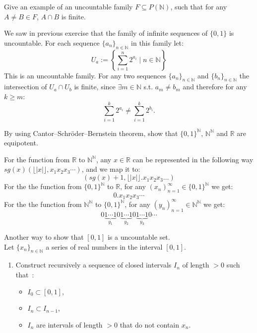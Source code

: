 \documentclass[a4paper,11pt]{exam}
\newcommand{\N}{\mathbb{N}}
\newcommand{\R}{\mathbb{R}}
\begin{document}
\begin{questions}
 
  \question
  Give an example of an uncountable family $F\subseteq P(\N)$, such that for any $A\neq B\in F$, $A\cap B$ is finite.

  \begin{solution}
    We saw in previous exercise that the family of infinite sequences of $\{0,1\}$ is uncountable. For each sequence $\{a_n\}_{n\in\N}$ in this family let: 
    \[ 
    	U_a:=\left\{\sum_{i=1}^n2^{a_i} \mid n\in\N\right\}
    \]    
    This is an uncountable family. For any two sequences $\{a_n\}_{n\in\N}$ and $\{b_n\}_{n\in\N}$ the intersection of $U_a\cap U_b$ is finite, since $\exists m\in \N$ s.t. $a_m \neq b_m$ and therefore for any $k\geq m$:
	\[ 
	  \sum_{i=1}^k2^{a_i} \neq \sum_{i=1}^k2^{b_i}.
	\] 
  \end{solution}
	

  \question
  By using Cantor–Schröder–Bernstein theorem, show that $\{0,1\}^\N$, $\N^\N$ and $\R$
  are equipotent.

  \begin{solution}
    For the function from $\R$ to $\N^\N$, any $ x\in\R $ can be represented in the following way $sg(x)(\lfloor |x| \rfloor, x_1 x_2 x_3 \cdots)$, and we map it to:
    \[
      (sg(x)+1, \lfloor |x| \rfloor. x_1 x_2 x_3 \ldots)
    \]
    For the the function from $\{0,1\}^\N$ to $\R$, for any $ (x_n)_{n=1}^\infty \in \{0,1\}^\N$  we get:
    \[
    	0.x_1 x_2 x_3 \cdots
    \]
    For the the function from $\N^\N$ to $\{0,1\}^\N$, for any $ (y_n)_{n=1}^\infty \in \N^\N$  we get:
        \[
          0 \underbrace{1 \cdots 1}_{y_1}
          0 \underbrace{1 \cdots 1}_{y_2}
          0 \underbrace{1 \cdots 1}_{y_3}
          0 \cdots
        \]
  \end{solution}
 \question Another way to show that $[0,1]$ is a uncountable set.\\
 Let $\{x_n\}_{n\in \N}$ a series of real numbers in the interval $[0,1]$.
 \begin{enumerate}
 	\item Construct recursively a sequence of closed intervals $I_n$ of length $>0$ such that~:
 	\begin{itemize}
 		\item $I_0 \subset [0,1]$, 
 		\item $I_n \subset I_{n-1}$,
 		\item $I_n$ are intervals of length $>0$ that do not contain $x_n$.
 	\end{itemize}
 	

\end{enumerate}
\end{questions}
\end{document}
